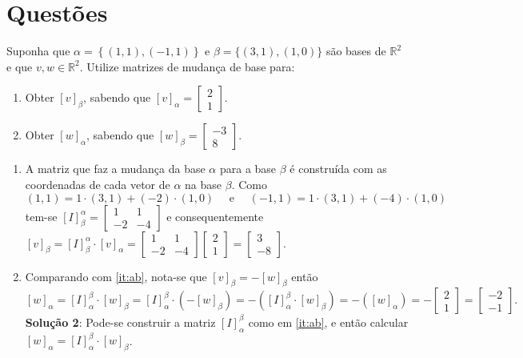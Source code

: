 \documentclass[12pt,a4paper]{article}
\newcommand*\R{\mathbb{R}}
\begin{document}
\section*{Questões}
\begin{ExerciseList}
\Exercise[title={2,5}] Suponha que
$\alpha = \left\{ (1,1), (-1,1)\right\}$
e
$\beta = \{ (3,1), (1,0) \}$ são bases de $\R^2$ e que $v, w \in \R^2$. Utilize matrizes de mudança de base para:
\begin{multicols}{2}
\begin{enumerate}
\item Obter $[v]_{\beta}$, sabendo que
$[v]_{\alpha} =
\begin{bmatrix}
2\\1
\end{bmatrix}$.
\item Obter $[w]_{\alpha}$, sabendo que
$[w]_{\beta} =
\begin{bmatrix}
-3\\8
\end{bmatrix}$.
\end{enumerate}
\end{multicols}
\Answer
\begin{enumerate}
\item \label{it:ab}A matriz que faz a mudança da base $\alpha$ para a base $\beta$ é construída com as coordenadas de cada vetor de $\alpha$ na base $\beta$. Como
\[
( 1, 1) = 1 \cdot (3,1) + (-2) \cdot (1,0)
\quad \text{ e } \quad
(-1, 1) = 1 \cdot (3,1) + (-4) \cdot (1,0)
\]
tem-se $[I]_{\beta}^{\alpha} =
\begin{bmatrix}
1 & 1 \\ -2 & -4
\end{bmatrix}$ e consequentemente
$[v]_{\beta}
= [I]_{\beta}^{\alpha} \cdot [v]_{\alpha}
=
\begin{bmatrix}
1 & 1 \\ -2 & -4
\end{bmatrix}
\begin{bmatrix}
2\\1
\end{bmatrix}
=
\begin{bmatrix}
3\\-8
\end{bmatrix}
$.
\item Comparando com  \eqref{it:ab}, nota-se que $[v]_{\beta} = - [w]_{\beta}$ então
\[
  [w]_{\alpha}
= [I]_{\alpha}^{\beta} \cdot [w]_{\beta}
= [I]_{\alpha}^{\beta} \cdot ( -[w]_{\beta} )
= - ([I]_{\alpha}^{\beta} \cdot [w]_{\beta})
= - ([w]_{\alpha})
= - \begin{bmatrix}
2\\1
\end{bmatrix}
= \begin{bmatrix}
-2\\-1
\end{bmatrix}.
\]
\textbf{Solução 2}: Pode-se construir a matriz $[I]_{\alpha}^{\beta}$ como em \eqref{it:ab}, e então calcular $[w]_{\alpha}
= [I]_{\alpha}^{\beta} \cdot [w]_{\beta}$.


\end{enumerate}
\end{ExerciseList}
\end{document}

